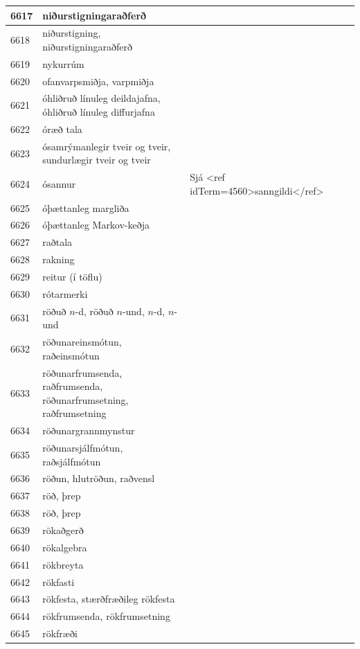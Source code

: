 \begin{longtable}{p{}|p{}|p{}|p{}|p{}}
\hline
6617 & niðurstigningaraðferð &  &  &  \\
\hline
6618 & niðurstigning, niðurstigningaraðferð &  &  &  \\
\hline
6619 & nykurrúm &  &  &  \\
\hline
6620 & ofanvarpsmiðja, varpmiðja &  &  &  \\
\hline
6621 & óhliðruð línuleg deildajafna, óhliðruð línuleg diffurjafna &  &  &  \\
\hline
6622 & óræð tala &  &  &  \\
\hline
6623 & ósamrýmanlegir tveir og tveir, sundurlægir tveir og tveir &  &  &  \\
\hline
6624 & ósannur & Sjá <ref idTerm=4560>sanngildi</ref> & &  \\
\hline
6625 & óþættanleg margliða &  &  &  \\
\hline
6626 & óþættanleg Markov-keðja &  &  &  \\
\hline
6627 & raðtala &  &  &  \\
\hline
6628 & rakning &  &  &  \\
\hline
6629 & reitur (í töflu) &  &  &  \\
\hline
6630 & rótarmerki &  &  &  \\
\hline
6631 & röðuð \(n\)-d, röðuð \(n\)-und, \(n\)-d, \(n\)-und &  &  &  \\
\hline
6632 & röðunareinsmótun, raðeinsmótun &  &  &  \\
\hline
6633 & röðunarfrumsenda, raðfrumsenda, röðunarfrumsetning, raðfrumsetning &  &  &  \\
\hline
6634 & röðunargrannmynstur &  &  &  \\
\hline
6635 & röðunarsjálfmótun, raðsjálfmótun &  &  &  \\
\hline
6636 & röðun, hlutröðun, raðvensl &  &  &  \\
\hline
6637 & röð, þrep &  &  &  \\
\hline
6638 & röð, þrep &  &  &  \\
\hline
6639 & rökaðgerð &  &  &  \\
\hline
6640 & rökalgebra &  &  &  \\
\hline
6641 & rökbreyta &  &  &  \\
\hline
6642 & rökfasti &  &  &  \\
\hline
6643 & rökfesta, stærðfræðileg rökfesta &  &  &  \\
\hline
6644 & rökfrumsenda, rökfrumsetning &  &  &  \\
\hline
6645 & rökfræði &  &  &  \\

\end{longtable}
